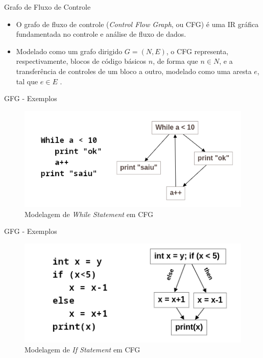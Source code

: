 \begin{frame}{Grafo de Fluxo de Controle}
    \begin{itemize}
        \item O grafo de fluxo de controle (\textit{Control Flow Graph}, ou CFG) é uma IR gráfica fundamentada no controle e análise de fluxo de dados.

        \item Modelado como um grafo dirigido $G=(N,E)$, o CFG representa, respectivamente, blocos de código básicos $n$, de forma que $n \in N$, e a transferência de controles de um bloco a outro, modelado como uma aresta $e$, tal que $e \in E$ \cite{allen1970control}.
    \end{itemize}
\end{frame}

\begin{frame}{GFG - Exemplos}
    \begin{figure}
        \centering
        \includegraphics[width=.8\textwidth]{Figuras/cfg.png}
        \caption{Modelagem de \textit{While Statement} em CFG}
        \label{fig:enter-label}
    \end{figure}
\end{frame}

\begin{frame}{GFG - Exemplos}
    \begin{figure}
        \centering
        \includegraphics[width=.8\textwidth]{Figuras/cfg2.png}
        \caption{Modelagem de \textit{If Statement} em CFG}
        \label{fig:enter-label}
    \end{figure}
\end{frame}